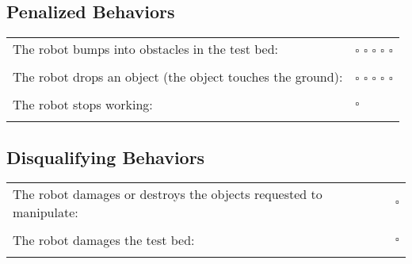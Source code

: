 \subsection*{Penalized Behaviors}
\begin{tabular}{ l l}
The robot bumps into obstacles in the test bed: & $\square$ $\square$ $\square$ $\square$ $\square$ \\ \\
The robot drops an object (the object touches the ground): & $\square$ $\square$ $\square$ $\square$ $\square$ \\ \\
The robot stops working: & $\square$  \\ \\
\end{tabular}

\subsection*{Disqualifying Behaviors}
\begin{tabular}{ l c}
The robot damages or destroys the objects requested to manipulate: & $\square$ \\ \\
The robot damages the test bed: & $\square$ \\ \\
\end{tabular}


